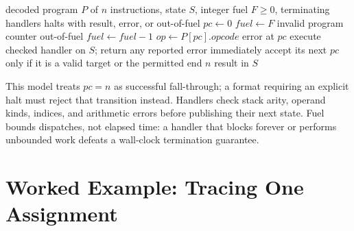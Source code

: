 \begin{algorithm}[htbp]
\caption{Bytecode dispatch loop with explicit errors and fuel}\label{alg:ch30-bytecode-loop}
\begin{pseudocode}
\Require decoded program $P$ of $n$ instructions, state $S$, integer fuel $F\ge0$, terminating handlers
\Ensure halts with result, error, or out-of-fuel
\State $pc \gets 0$
\State $fuel \gets F$
\State \Return invalid program counter
\EndIf
{}
\State \Return out-of-fuel
\EndIf
\State $fuel \gets fuel - 1$
\State $op \gets P[pc].opcode$
\State \Return error at $pc$
\EndIf
\State execute checked handler on $S$; return any reported error immediately
\State accept its next $pc$ only if it is a valid target or the permitted end $n$
\EndWhile
\State \Return result in $S$
\end{pseudocode}
\end{algorithm}

This model treats $pc=n$ as successful fall-through; a format requiring an explicit halt must reject that transition instead.
Handlers check stack arity, operand kinds, indices, and arithmetic errors before publishing their next state.
Fuel bounds dispatches, not elapsed time: a handler that blocks forever or performs unbounded work defeats a wall-clock termination guarantee.

\section{Worked Example: Tracing One Assignment}\label{sec:ch30-worked}

